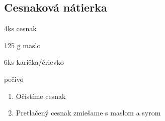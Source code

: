 \setcounter{step}{0}
\subsection{Cesnaková nátierka}

\begin{ingredient}
\def\portions{4}%

\begin{main}
	\item 4ks cesnak
	\item 125 g maslo
	\item 6ks karička/črievko
  \item pečivo
\end{main}
\end{ingredient}
\begin{recipe}

\begin{enumerate}

\item{Očistíme cesnak}
\item{Pretlačený cesnak zmiešame s maslom a syrom}

\end{enumerate}
\end{recipe}

\begin{notes}

\end{notes}
\clearpage	
